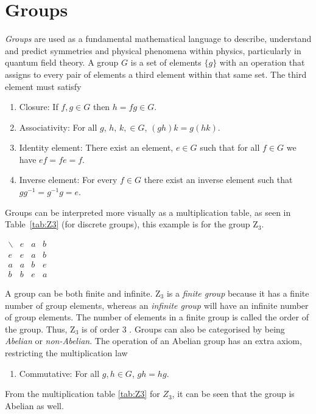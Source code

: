 \section{Groups}\label{app:groups}
\textit{Groups} are used as a fundamental mathematical language to describe, understand and predict symmetries and physical phenomena within physics, particularly in quantum field theory. A group $G$  is a set of elements $\{g\}$ with an operation that assigns to every pair of elements a third element within that same set. The third element must satisfy \cite{Georgi:1999wka}
\begin{enumerate}
    \item Closure: If $f,g \in G$ then $h=fg\in G$.
    \item Associativity: For all $g,\,h,\,k,\in G$, $(gh)k=g(hk)$.
    \item Identity element: There exist an element, $e\in G$ such that for all $f\in G$ we have $ef=fe=f$.
    \item Inverse element: For every $f\in G$ there exist an inverse element such that $gg^{-1}=g^{-1}g=e$.
\end{enumerate}
Groups can be interpreted more visually as a multiplication table, as seen in Table~\ref{tab:Z3} (for discrete groups), this example is for the group $\mathrm{Z}_3$.
\begin{table}[h]
    \centering
    $
    \begin{array}{c||c|c|c} %
        \backslash & e & a & b \\
        \hline\hline
        e & e & a & b \\
        \hline
        a & a & b & e \\
        \hline
        b & b & e & a  %
    \end{array}
    $
    \caption{Multiplication table of the finite group $\mathrm{Z}_3$.}
    \label{tab:Z3}
\end{table}
A group can be both finite and infinite. $\mathrm{Z}_3$ is a \textit{finite group} because it has a finite number of group elements, whereas an \textit{infinite group} will have an infinite number of group elements. The number of elements in a finite group is called the order of the group. Thus, $\mathrm{Z}_3$ is of order $3$ \cite{Georgi:1999wka}. Groups can also be categorised by being \textit{Abelian} or \textit{non-Abelian}. The operation of an Abelian group has an extra axiom, restricting the multiplication law
\begin{enumerate}
    \item Commutative: For all $g,h\in G$, $gh=hg$.
\end{enumerate}
From the multiplication table  \ref{tab:Z3} for $Z_3$, it can be seen that the group is Abelian as well. 

